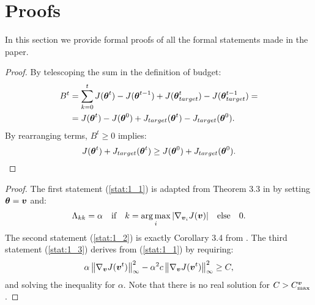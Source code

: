 \chapter{Proofs}
\label{app:proofs}
\thispagestyle{empty}



In this section we provide formal proofs of all the formal statements made in the paper.

\nonnegativebudget*
\begin{proof}
	By telescoping the sum in the definition of budget:
	\begin{align*}
	B^t &= \sum_{k=0}^t J(\vtheta^t) - J(\vtheta^{t-1}) + J(\vtheta_{target}^t) - J(\vtheta_{target}^{t-1}) 
	=\\&= J(\vtheta^t) - J(\vtheta^0) + J_{target}(\vtheta^t) - J_{target}(\vtheta^0).
	\end{align*}
	By rearranging terms, $B^t \geq 0$ implies:
	\begin{equation*}
	J(\vtheta^t)  + J_{target}(\vtheta^t)  \geq J(\vtheta^0) + J_{target}(\vtheta^0).
	\end{equation*}
\end{proof}

\safetheta*
\begin{proof}
The first statement (\ref{stat:1_1}) is adapted from Theorem 3.3 in \cite{adaptive_batch} by setting $\vtheta = \vv$ and:
\[
	\Lambda_{kk} = \alpha \quad\text{if}\quad  k=\argmax_i |\gradJ[\vv_i]{\vv}|
	\quad \text{else} \quad 0.
\]
The second statement (\ref{stat:1_2}) is exactly Corollary 3.4 from \cite{adaptive_batch}.
The third statement (\ref{stat:1_3}) derives from (\ref{stat:1_1}) by requiring:
\[
	\alpha\norm[\infty]{\gradJ[\vv]{\vv^t}}^2 - 
	\alpha^2 c \norm[\infty]{\gradJ[\vv]{\vv^t}}^2 \geq C,
\]
and solving the inequality for $\alpha$. Note that there is no real solution for $C>C_{\text{max}}^{\vv}$.
\end{proof}


